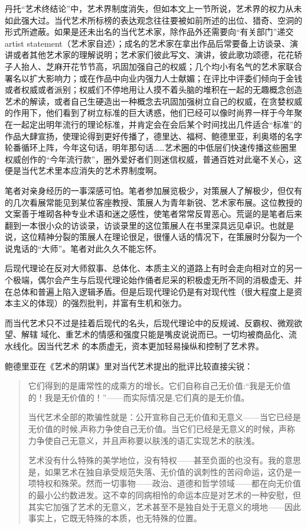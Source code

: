 丹托“艺术终结论”中，艺术界制度消失，但如本文上一节所说，艺术界的权力从未如此强大过。当代艺术所标榜的表达观念往往要被如前所述的出位、猎奇、空洞的形式所遮蔽。如果是还未出名的当代艺术家，除作品外还需要向“有关部门”递交artist statement（艺术家自述）；成名的艺术家在拿出作品后常要备上访谈录、演讲或者其他艺术家的理解说明；艺术家们彼此写文、演讲，彼此歌功颂德，花花轿子人抬人、芝麻开花节节高，巩固加强自己的权威；几个均小有名气的艺术家联合署名以扩大影响力；或在作品中向业内强力人士献媚；在评比中评委们倾向于金钱或者权威或者派别；权威们不停地用让人摸不着头脑的堆积在一起的无趣概念创造艺术的解读，或者自己生硬造出一种概念去巩固加强树立自己的权威，在贪婪权威的作用下，他们看到了树立标准的巨大诱惑，他们已经可以像时尚界一样于今年聚在一起定出明年流行的理论标准，并肯定会在会后某个时间找出几件适合“标准”的作品大肆宣扬，使理论得到更好传播了，德里达、福柯、鲍德里亚，利奥塔的名字轮番循环上阵，今年这句话，明年那句话……艺术圈的中低层们快速传播这些圈里权威创作的“今年流行款”，圈外爱好者们则迷信权威，普通百姓对此毫不关心，这便是当代艺术里本应消失的艺术界制度啊。

笔者对亲身经历的一事深感可怕。笔者参加展览极少，对策展人了解极少，但仅有的几次看展常能见到某位客座教授、策展人为青年新锐、艺术家布展。这位教授的文案善于堆砌各种专业术语和迷之感性，使笔者常常反胃恶心。荒诞的是笔者后来翻到一本很小众的访谈录，访谈录里的这位策展人在书里深具远见卓识。也就是说，这位精神分裂的策展人在理论很足，很懂人话的情况下，在策展时分裂为一个说鬼话的“大师”。笔者对此久久不能忘怀。

后现代理论在反对大师叙事、总体化、本质主义的道路上有时会走向相对立的另一个极端，偶尔会产生与后现代理论始作俑者尼采的积极虚无所不同的消极虚无、并在总体和普遍上陷入逻辑矛盾。但是后现代理论仍是有对现代性（很大程度上是资本主义的体现）的强烈批判，并富有生机和张力。

而当代艺术只不过是挂着后现代的名头，后现代理论中的反规诫、反霸权、微观欲望、解辖
域化、重艺术的情感和强度只能是嘴皮说说而已。一切均被商品化、流水线化。因当代艺术
的本质虚无，资本更加轻易操纵和控制了艺术界。

鲍德里亚在《艺术的阴谋》里对当代艺术提出的批评比较直接尖锐：
\begin{quotation}它们得到的是庸常性的成乘方的增长。它们自称自己无价值:“我是无价值的！我是无价值的！”——而实际情况是,它们真的是无价值。

当代艺术全部的欺骗性就是：公开宣称自己无价值和无意义——当它已经是无价值的时候,声称力争使自己无价值。当它们已经是无意义的时候，声称力争使自己无意义，并且声称要以肤浅的语汇实现艺术的肤浅。\cite{artistyinmou}

艺术没有什么特殊的美学地位，没有特权——甚至负面的也没有。我的意思是，如果艺术在独自承受规范失落、无价值的讽刺性的苦闷命运，这仍是一项特权和殊荣。然而一切事物——政治、道德和哲学领域——都在向无价值的最小公约数进发。这不幸的同病相怜的命运本应是对艺术的一种安慰，但其实它加强了艺术的无意义，艺术甚至不是独自处于无意义的境地——因此事实上，它既无特殊的本质，也无特殊的位置。\cite{yishudexiaoshi}

\end{quotation}

